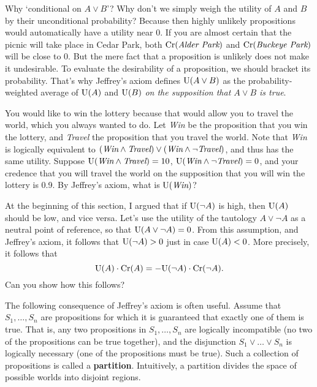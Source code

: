 Why `conditional on $A \lor B$'? Why don't we simply weigh the utility of $A$
and $B$ by their unconditional probability? Because then highly unlikely
propositions would automatically have a utility near 0. If you are almost
certain that the picnic will take place in Cedar Park, both
$\text{Cr}(\emph{Alder Park})$ and $\text{Cr}(\emph{Buckeye Park})$ will be close to 0. But
the mere fact that a proposition is unlikely does not make it undesirable. To
evaluate the desirability of a proposition, we should bracket its probability.
That's why Jeffrey's axiom defines $\text{U}(A \lor B)$ as the probability-weighted
average of $\text{U}(A)$ and $\text{U}(B)$ \emph{on the supposition that $A \lor B$ is
  true}.

\begin{exercise}{2}
  You would like to win the lottery because that would allow you to travel the
  world, which you always wanted to do. Let \emph{Win} be the proposition that
  you win the lottery, and \emph{Travel} the proposition that you travel the
  world. Note that \emph{Win} is logically equivalent to
  $(\emph{Win} \land \emph{Travel}) \lor (\emph{Win} \land \neg \emph{Travel})$,
  and thus has the same utility. Suppose
  $\text{U}(\emph{Win} \land \emph{Travel}) = 10$,
  $\text{U}(\emph{Win} \land \neg \emph{Travel}) = 0$, and your credence that you will
  travel the world on the supposition that you will win the lottery is 0.9. By
  Jeffrey's axiom, what is $\text{U}(\emph{Win})$?
\end{exercise}

\begin{exercise}{2}
  At the beginning of this section, I argued that if $\text{U}(\neg A)$ is high, then
  $\text{U}(A)$ should be low, and vice versa. Let's use the utility of the tautology
  $A \lor \neg A$ as a neutral point of reference, so that
  $\text{U}(A \lor \neg A) = 0$. From this assumption, and Jeffrey's axiom, it follows
  that $\text{U}(\neg A) > 0$ just in case $\text{U}(A) < 0$. More precisely, it follows
  that
  \[
  \text{U}(A)\cdot \text{Cr}(A) = - \text{U}(\neg A)\cdot \text{Cr}(\neg A).
  \]
  Can you show how this follows?
\end{exercise}

The following consequence of Jeffrey's axiom is often useful. Assume that
$S_{1},\ldots,S_{n}$ are propositions for which it is guaranteed that exactly
one of them is true. That is, any two propositions in $S_{1},\ldots,S_{n}$ are
logically incompatible (no two of the propositions can be true together), and
the disjunction $S_{1}\lor\ldots\lor S_{n}$ is logically necessary (one of the
propositions must be true). Such a collection of propositions is called a
\textbf{partition}. Intuitively, a partition divides the space of possible
worlds into disjoint regions.


